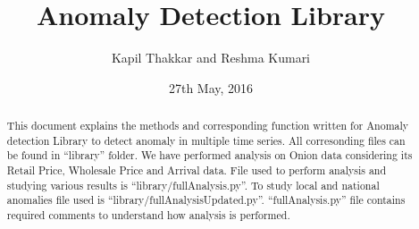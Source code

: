 \documentclass[a4paper,10pt]{report}
\title{Anomaly Detection Library}
\author{Kapil Thakkar and Reshma Kumari}
\date{27th May, 2016}
\begin{document}
\maketitle

\begin{abstract}

This document explains the methods and corresponding function written for Anomaly detection Library to detect anomaly in multiple time series. All corresonding files can be found in ``library'' folder. We have performed analysis on Onion data considering its Retail Price, Wholesale Price and Arrival data. File used to perform analysis and studying various results is ``library/fullAnalysis.py''. To study local and national anomalies file used is ``library/fullAnalysisUpdated.py''. ``fullAnalysis.py'' file contains required comments to understand how analysis is performed.

\end{abstract}


\tableofcontents{}

 
 
 
 

 



\end{document}

